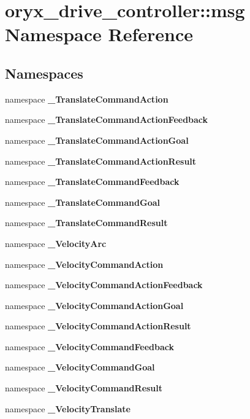 \section{oryx\-\_\-drive\-\_\-controller\-:\-:msg \-Namespace \-Reference}
\label{namespaceoryx__drive__controller_1_1msg}
\subsection*{\-Namespaces}
\begin{DoxyCompactItemize}
\item 
namespace {\bf \-\_\-\-Translate\-Command\-Action}
\item 
namespace {\bf \-\_\-\-Translate\-Command\-Action\-Feedback}
\item 
namespace {\bf \-\_\-\-Translate\-Command\-Action\-Goal}
\item 
namespace {\bf \-\_\-\-Translate\-Command\-Action\-Result}
\item 
namespace {\bf \-\_\-\-Translate\-Command\-Feedback}
\item 
namespace {\bf \-\_\-\-Translate\-Command\-Goal}
\item 
namespace {\bf \-\_\-\-Translate\-Command\-Result}
\item 
namespace {\bf \-\_\-\-Velocity\-Arc}
\item 
namespace {\bf \-\_\-\-Velocity\-Command\-Action}
\item 
namespace {\bf \-\_\-\-Velocity\-Command\-Action\-Feedback}
\item 
namespace {\bf \-\_\-\-Velocity\-Command\-Action\-Goal}
\item 
namespace {\bf \-\_\-\-Velocity\-Command\-Action\-Result}
\item 
namespace {\bf \-\_\-\-Velocity\-Command\-Feedback}
\item 
namespace {\bf \-\_\-\-Velocity\-Command\-Goal}
\item 
namespace {\bf \-\_\-\-Velocity\-Command\-Result}
\item 
namespace {\bf \-\_\-\-Velocity\-Translate}
\end{DoxyCompactItemize}
